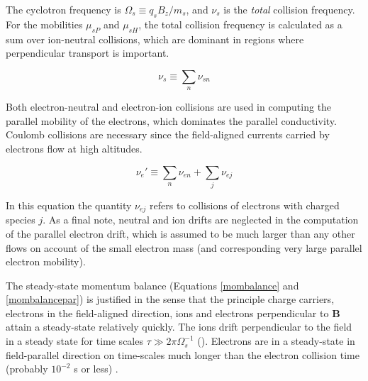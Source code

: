 \documentclass[11pt,letterpaper]{article}
\begin{document}
The cyclotron frequency is $\Omega_s \equiv q_s B_z/m_s$, and $\nu_s$ is the \emph{total} collision frequency.  For the mobilities $\mu_{sP}$ and $\mu_{sH}$, the total collision frequency is calculated as a sum over ion-neutral collisions, which are dominant in regions where perpendicular transport is important.  
\begin{linenomath*} \begin{equation}
\nu_s \equiv \sum_n \nu_{sn} 
\end{equation} \end{linenomath*}
Both electron-neutral and electron-ion collisions are used in computing the parallel mobility of the electrons, which dominates the parallel conductivity.  Coulomb collisions are necessary since the field-aligned currents carried by electrons flow at high altitudes.
\begin{linenomath*} \begin{equation}
\nu_e' \equiv \sum_n \nu_{en} + \sum_j \nu_{ej}
\end{equation} \end{linenomath*}
In this equation the quantity $\nu_{ej}$ refers to collisions of electrons with charged species $j$.  As a final note, neutral and ion drifts are neglected in the computation of the parallel electron drift, which is assumed to be much larger than any other flows on account of the small electron mass (and corresponding very large parallel electron mobility).

The steady-state momentum balance (Equations \ref{mombalance} and \ref{mombalancepar}) is justified in the sense that the principle charge carriers, electrons in the field-aligned direction, ions and electrons perpendicular to $\mathbf{B}$ attain a steady-state relatively quickly.  The ions drift perpendicular to the field in a steady state for time scales $\tau \gg 2 \pi \Omega_s^{-1}$ ().  Electrons are in a steady-state in field-parallel direction on time-scales much longer than the electron collision time (probably $10^{-2}$ s or less) \citep[e.g.][]{Stmaurice:1996}.
\end{document}
